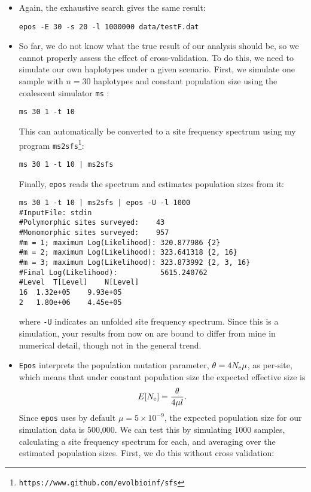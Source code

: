 \documentclass[a4paper, english]{article}
\newcommand{\ty}{\texttt}
\begin{document}
\begin{itemize}
\begin{verbatim}
#m = 3; no improvement
#Final Log(Likelihood):          12693437.619085
#Level	T[Level]	N[Level]
27	1.32e+04	6.44e+05
2	7.39e+05	1.89e+05
\end{verbatim}
\item Again, the exhaustive search gives the same result:
\begin{verbatim}
epos -E 30 -s 20 -l 1000000 data/testF.dat 
\end{verbatim}
\item So far, we do not know what the true result of our analysis
  should be, so we cannot properly assess the effect of
  cross-validation. To do this, we need to simulate our own haplotypes
  under a given scenario. First, we simulate one sample with
  $n=30$ haplotypes and constant population size using the coalescent simulator \ty{ms} \citep{hud02:gen}:
\begin{verbatim}
ms 30 1 -t 10 
\end{verbatim}
This can automatically be converted to a site frequency spectrum using
my program \ty{ms2sfs}\footnote{\ty{https://www.github.com/evolbioinf/sfs}}:
\begin{verbatim}
ms 30 1 -t 10 | ms2sfs
\end{verbatim}
Finally, \ty{epos} reads the spectrum and estimates population
sizes from it:
\begin{verbatim}
ms 30 1 -t 10 | ms2sfs | epos -U -l 1000
#InputFile:	stdin
#Polymorphic sites surveyed:	43
#Monomorphic sites surveyed:	957
#m = 1; maximum Log(Likelihood): 320.877986	{2}
#m = 2; maximum Log(Likelihood): 323.641318	{2, 16}
#m = 3; maximum Log(Likelihood): 323.873992	{2, 3, 16}
#Final Log(Likelihood):          5615.240762
#Level	T[Level]	N[Level]
16	1.32e+05	9.93e+05
2	1.80e+06	4.45e+05
\end{verbatim}
where \ty{-U} indicates an unfolded site frequency spectrum. Since
this is a simulation, your results from now on are bound to differ
from mine in
numerical detail, though not in the general trend.
\item \ty{Epos} interprets the population mutation parameter,
$\theta=4N_{\rm e}\mu$, as per-site, which means that under constant
population size the expected effective size is
\[
E[N_{\rm e}]=\frac{\theta}{4\mu l}.
\]
Since \ty{epos} uses by default $\mu=5\times 10^{-9}$, the expected
population size for our simulation data is 500,000. We can
test this by simulating 1000 samples, calculating a site frequency
spectrum for each, and averaging over the estimated population
sizes. First, we do this without cross validation:

\end{itemize}
\end{document}
